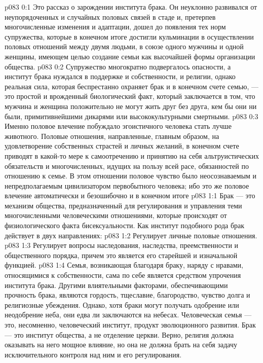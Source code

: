 \author{Глава Серафимов}
\vs p083 0:1 Это рассказ о зарождении института брака. Он неуклонно развивался от неупорядоченных и случайных половых связей в стаде и, претерпев многочисленные изменения и адаптации, дошел до появления тех норм супружества, которые в конечном итоге достигли кульминации в осуществлении половых отношений между двумя людьми, в союзе одного мужчины и одной женщины, имеющем целью создание семьи как высочайшей формы организации общества.
\vs p083 0:2 Супружество многократно подвергалось опасности, а институт брака нуждался в поддержке и собственности, и религии, однако реальная сила, которая беспрестанно охраняет брак и в конечном счете семью, --- это простой и врожденный биологический факт, который заключается в том, что мужчина и женщина положительно не могут жить друг без друга, кем бы они ни были, примитивнейшими дикарями или высококультурными смертными.
\vs p083 0:3 Именно половое влечение побуждало эгоистичного человека стать лучше животного. Половые отношения, направленные, главным образом, на удовлетворение собственных страстей и личных желаний, в конечном счете приводят в какой\hyp{}то мере к самоотречению и принятию на себя альтруистических обязательств и многочисленных, идущих на пользу всей расе, обязанностей по отношению к семье. В этом отношении половое чувство было неосознаваемым и непредполагаемым цивилизатором первобытного человека; ибо это же половое влечение автоматически и безошибочно  и в конечном итоге 
\vs p083 1:1 Брак --- это механизм общества, предназначенный для регулирования и управления теми многочисленными человеческими отношениями, которые происходят от физиологического факта бисексуальности. Как институт подобного рода брак действует в двух направлениях:
\vs p083 1:2 \bibnobreakspace Регулирует личные половые отношения.
\vs p083 1:3 \bibnobreakspace Регулирует вопросы наследования, наследства, преемственности и общественного порядка, причем это является его старейшей и изначальной функцией.
\vs p083 1:4 \pc Семья, возникающая благодаря браку, наряду с нравами, относящимися к собственности, сама по себе является средством упрочения института брака. Другими влиятельными факторами, обеспечивающими прочность брака, являются гордость, тщеславие, благородство, чувство долга и религиозные убеждения. Однако, хотя браки могут получать одобрение или неодобрение неба, они едва ли заключаются на небесах. Человеческая семья --- это, несомненно, человеческий институт, продукт эволюционного развития. Брак --- это институт общества, а не отделение церкви. Верно, религия должна оказывать на него мощное влияние, но она не должна брать на себя задачу исключительного контроля над ним и его регулирования.
